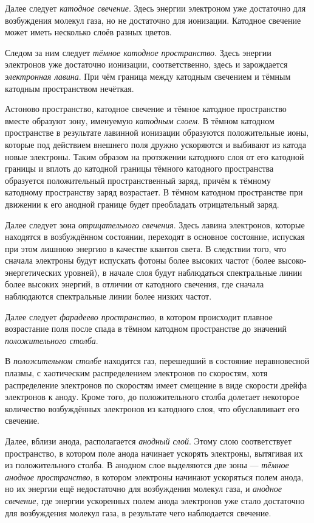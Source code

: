 \documentclass[a4paper, usenames, dvipsnames]{article}
\begin{document}
Далее следует {\it катодное свечение}. Здесь энергии электроном уже
достаточно для возбуждения молекул газа, но не достаточно для ионизации.
Катодное свечение может иметь несколько слоёв разных цветов.

Следом за ним следует {\it тёмное катодное пространство}.
Здесь энергии электронов уже достаточно ионизации,
соответственно, здесь и зарождается {\it электронная лавина}.
При чём граница между катодным свечением и тёмным
катодным пространством нечёткая.

Астоново пространство, катодное свечение и тёмное катодное пространство
вместе образуют зону, именуемую {\it катодным слоем}.
В тёмном катодном пространстве в результате лавинной ионизации образуются
положительные ионы, которые под действием внешнего поля дружно ускоряются
и выбивают из катода новые электроны.
Таким образом на протяжении катодного слоя
от его катодной границы и вплоть до катодной границы тёмного катодного пространства
образуется положительный пространственный заряд, причём к тёмному катодному пространству
заряд возрастает. В тёмном катодном пространстве при движении к его анодной границе
будет преобладать отрицательный заряд.

Далее следует зона {\it отрицательного свечения}.
Здесь лавина электронов, которые находятся в возбуждённом состоянии,
переходят в основное состояние, испуская при этом лишнюю энергию в
качестве квантов света. В следствии того, что сначала электроны будут испускать
фотоны более высоких частот (более высоко-энергетических уровней),
в начале слоя будут наблюдаться спектральные линии более высоких энергий,
в отличии от катодного свечения, где сначала наблюдаются спектральные линии
более низких частот.

Далее следует {\it фарадеево пространство},
в котором происходит плавное возрастание поля после спада в тёмном катодном пространстве
до значений {\it положительного столба}.

В {\it положительном столбе} находится газ, перешедший в состояние неравновесной плазмы,
с хаотическим распределением электронов по скоростям, хотя распределение электронов
по скоростям имеет смещение в виде скорости дрейфа электронов к аноду.
Кроме того, до положительного столба долетает некоторое количество
возбуждённых электронов из катодного слоя,
что обуславливает его свечение.

Далее, вблизи анода, располагается {\it анодный слой}.
Этому слою соответствует пространство, в котором поле анода
начинает ускорять электроны, вытягивая их из положительного столба.
В анодном слое выделяются две зоны --- {\it тёмное анодное пространство},
в котором электроны начинают ускоряться полем анода,
но их энергии ещё недостаточно для возбуждения молекул газа, и
{\it анодное свечение}, где энергии ускоренных полем анода электронов уже стало
достаточно для возбуждения молекул газа, в результате чего наблюдается свечение.
\end{document}
